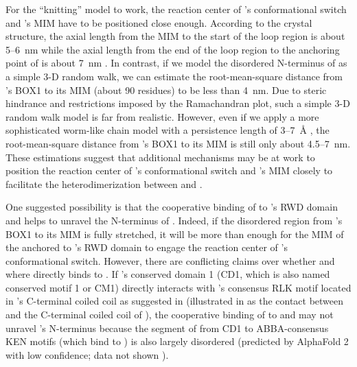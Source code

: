 For the ``knitting'' model to work, the reaction center of 's conformational switch and 's MIM have to be positioned close enough. According to the crystal structure, the axial length from the MIM to the start of the loop region is about 5--\SI{6}{nm} while the axial length from the end of the loop region to the anchoring point of  is about \SI{7}{nm} \cite{TemplateModel, Ji2017eLife, BUB1-CDC20-MAD1, Structure1GO4, Structure4DZO, BUB1-CDC20-MAD1}. In contrast, if we model the disordered N-terminus of  as a simple 3-D random walk, we can estimate the root-mean-square distance from 's BOX1 to its MIM (about 90 residues) to be less than \SI{4}{nm}. Due to steric hindrance and restrictions imposed by the Ramachandran plot, such a simple 3-D random walk model is far from realistic. However, even if we apply a more sophisticated worm-like chain model with a persistence length of 3--\SI{7}{\r{A}} \cite{PeptidePersistentLengthFitting, RandomWalk3D-WormLikeChain}, the root-mean-square distance from 's BOX1 to its MIM is still only about 4.5--\SI{7}{nm}. These estimations suggest that additional mechanisms may be at work to position the reaction center of 's conformational switch and 's MIM closely to facilitate the heterodimerization between  and .

One suggested possibility \cite{BUB1-CDC20-MAD1, Tripartite} is that the cooperative binding of  to 's RWD domain and  helps to unravel the N-terminus of . Indeed, if the disordered region from 's BOX1 to its MIM is fully stretched, it will be more than enough for the MIM of the  anchored to 's RWD domain to engage the reaction center of 's conformational switch. However, there are conflicting claims over whether and where  directly binds to  \cite{Ji2017eLife, BUB1-CDC20-MAD1, BUB1CD1-MAD1CStructure}. If 's conserved domain 1 (CD1, which is also named conserved motif 1 or CM1) directly interacts with 's consensus RLK motif located in 's C-terminal coiled coil as suggested in \cite{Ji2017eLife, BUB1CD1-MAD1CStructure} (illustrated in  as the contact between  and the C-terminal coiled coil of ), the cooperative binding of  to  and  may not unravel 's N-terminus because the segment of  from CD1 to ABBA-consensus KEN motifs (which bind to  \cite{BUB1-CDC20-MAD1, CDC20-KEN, ABBA}) is also largely disordered (predicted by AlphaFold 2 with low confidence; data not shown \cite{UniProtAlphaFold}).

